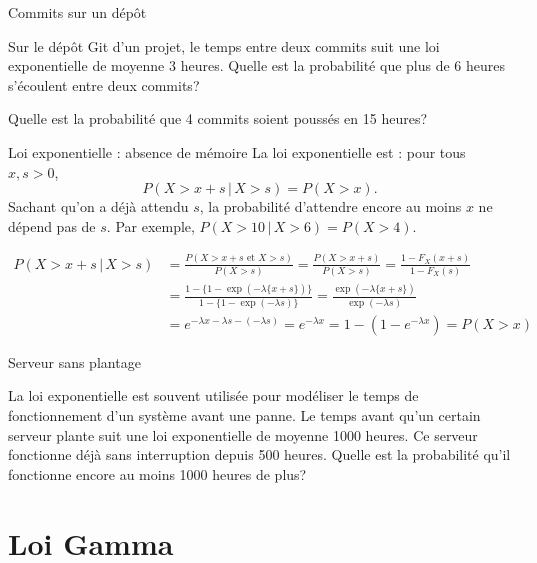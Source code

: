 \documentclass{BeamerTemplate}
\newcommand{\cibleReponse}{}
\newcommand{\lienreponse}[1]{\gdef\cibleReponse{#1}}
\begin{document}
\begin{frame}[t,label=excommits]{Commits sur un dépôt}

{\small
Sur le dépôt Git d'un projet, le temps entre deux commits suit une loi exponentielle
de moyenne 3 heures. Quelle est la probabilité que plus de 6 heures s'écoulent entre
deux commits?

\vspace{1in} Quelle est la probabilité que 4 commits soient poussés en 15 heures?
}
\lienreponse{rep-ex1}
\end{frame}


\begin{frame}[t]{Loi exponentielle : absence de mémoire}
La loi exponentielle est  : pour tous $x,s>0$,
$$P(X>x+s\,|\,X>s)=P(X>x).$$
{\small Sachant qu'on a déjà attendu $s$, la probabilité d'attendre encore au moins $x$ ne
dépend pas de $s$. Par exemple, $P(X>10\,|\,X>6)=P(X>4)$.}

{\small
\begin{align*}
P(X>x+s\,|\,X>s)&=\frac{P(X>x+s\text{\ et\ }X>s)}{P(X>s)}
=\frac{P(X>x+s)}{P(X>s)}
=\frac{1-F_X(x+s)}{1-F_X(s)}\\[6pt]
&=\frac{1-\{1-\exp(-\lambda\{x+s\})\}}
{1-\{1-\exp(-\lambda s)\}}=\frac{\exp(-\lambda\{x+s\})}{\exp(-\lambda s)}\\[6pt]
&=e^{-\lambda x-\lambda s -(-\lambda s)} =e^{-\lambda x}
=1-(1-e^{-\lambda x})=P(X>x)
\end{align*}
}
\end{frame}


\begin{frame}[t,label=exserveur]{Serveur sans plantage}

{\small
La loi exponentielle est souvent utilisée pour modéliser le temps de fonctionnement
d'un système avant une panne. Le temps avant qu'un certain serveur plante suit une loi
exponentielle de moyenne 1000 heures. Ce serveur fonctionne déjà sans interruption depuis
500 heures. Quelle est la probabilité qu'il fonctionne encore au moins 1000 heures de plus?
}
\lienreponse{rep-ex1}
\end{frame}

\section{Loi Gamma}
\end{document}
